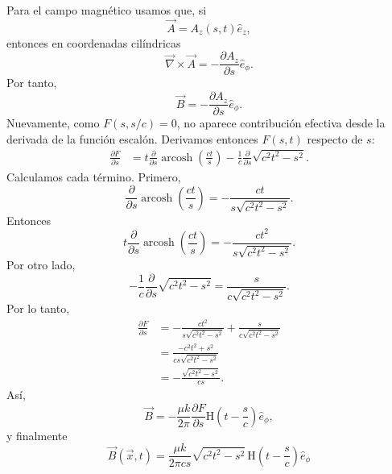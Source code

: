 \documentclass{article}
\numberwithin{equation}{section}
\newcommand{\Hh}{\mathrm H}
\newcommand{\arcosh}{\operatorname{arcosh}}
\begin{document}
Para el campo magnético usamos que, si
\begin{equation*}
    \vec A=A_z(s,t)\hat e_z,
\end{equation*}
entonces en coordenadas cilíndricas
\begin{equation*}
    \vec\nabla\times\vec A
    =-\frac{\partial A_z}{\partial s}\hat e_\phi.
\end{equation*}
Por tanto,
\begin{equation*}
    \vec B=-\frac{\partial A_z}{\partial s}\hat e_\phi.
\end{equation*}
Nuevamente, como $F(s,s/c)=0$, no aparece contribución efectiva desde la derivada de la función escalón. Derivamos entonces $F(s,t)$ respecto de $s$:
\begin{align*}
    \frac{\partial F}{\partial s}
    &=t\frac{\partial}{\partial s}\arcosh\left(\frac{ct}{s}\right)
    -\frac{1}{c}\frac{\partial}{\partial s}\sqrt{c^2t^2-s^2}.
\end{align*}
Calculamos cada término. Primero,
\begin{equation*}
    \frac{\partial}{\partial s}\arcosh\left(\frac{ct}{s}\right)
    =-\frac{ct}{s\sqrt{c^2t^2-s^2}}.
\end{equation*}
Entonces
\begin{equation*}
    t\frac{\partial}{\partial s}\arcosh\left(\frac{ct}{s}\right)
    =-\frac{ct^2}{s\sqrt{c^2t^2-s^2}}.
\end{equation*}
Por otro lado,
\begin{equation*}
    -\frac{1}{c}\frac{\partial}{\partial s}\sqrt{c^2t^2-s^2}
    =\frac{s}{c\sqrt{c^2t^2-s^2}}.
\end{equation*}
Por lo tanto,
\begin{align*}
    \frac{\partial F}{\partial s}
    &=-\frac{ct^2}{s\sqrt{c^2t^2-s^2}}
    +\frac{s}{c\sqrt{c^2t^2-s^2}}\\
    &=\frac{-c^2t^2+s^2}{cs\sqrt{c^2t^2-s^2}}\\
    &=-\frac{\sqrt{c^2t^2-s^2}}{cs}.
\end{align*}
Así,
\begin{equation*}
    \vec B
    =-\frac{\mu k}{2\pi}\frac{\partial F}{\partial s}
    \Hh\left(t-\frac{s}{c}\right)\hat e_\phi,
\end{equation*}
y finalmente
\begin{equation*}
    \boxed{
    \vec B(\vec x,t)
    =\frac{\mu k}{2\pi cs}\sqrt{c^2t^2-s^2}\,
    \Hh\left(t-\frac{s}{c}\right)\hat e_\phi
    }
\end{equation*}
\end{document}
